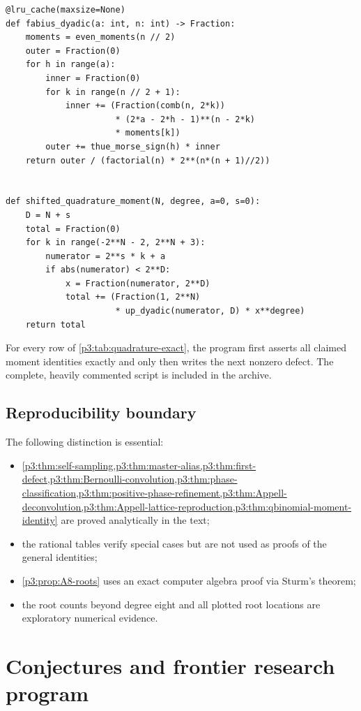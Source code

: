 \documentclass[11pt,oneside]{article}
\numberwithin{equation}{section}
\theoremstyle{definition}
\theoremstyle{remark}
\begin{document}
\begin{lstlisting}[style=frontiercode,caption={Exact dyadic Fabius evaluation and shifted moment quadrature.}]
@lru_cache(maxsize=None)
def fabius_dyadic(a: int, n: int) -> Fraction:
    moments = even_moments(n // 2)
    outer = Fraction(0)
    for h in range(a):
        inner = Fraction(0)
        for k in range(n // 2 + 1):
            inner += (Fraction(comb(n, 2*k))
                      * (2*a - 2*h - 1)**(n - 2*k)
                      * moments[k])
        outer += thue_morse_sign(h) * inner
    return outer / (factorial(n) * 2**(n*(n + 1)//2))


def shifted_quadrature_moment(N, degree, a=0, s=0):
    D = N + s
    total = Fraction(0)
    for k in range(-2**N - 2, 2**N + 3):
        numerator = 2**s * k + a
        if abs(numerator) < 2**D:
            x = Fraction(numerator, 2**D)
            total += (Fraction(1, 2**N)
                      * up_dyadic(numerator, D) * x**degree)
    return total
\end{lstlisting}

For every row of \cref{p3:tab:quadrature-exact}, the program first asserts all claimed moment identities exactly and only then writes the next nonzero defect.  The complete, heavily commented script is included in the archive.

\subsection{Reproducibility boundary}

The following distinction is essential:
\begin{itemize}
\item \cref{p3:thm:self-sampling,p3:thm:master-alias,p3:thm:first-defect,p3:thm:Bernoulli-convolution,p3:thm:phase-classification,p3:thm:positive-phase-refinement,p3:thm:Appell-deconvolution,p3:thm:Appell-lattice-reproduction,p3:thm:qbinomial-moment-identity} are proved analytically in the text;
\item the rational tables verify special cases but are not used as proofs of the general identities;
\item \cref{p3:prop:A8-roots} uses an exact computer algebra proof via Sturm's theorem;
\item the root counts beyond degree eight and all plotted root locations are exploratory numerical evidence.
\end{itemize}

\section{Conjectures and frontier research program}
\label{p3:sec:frontier}
\end{document}
